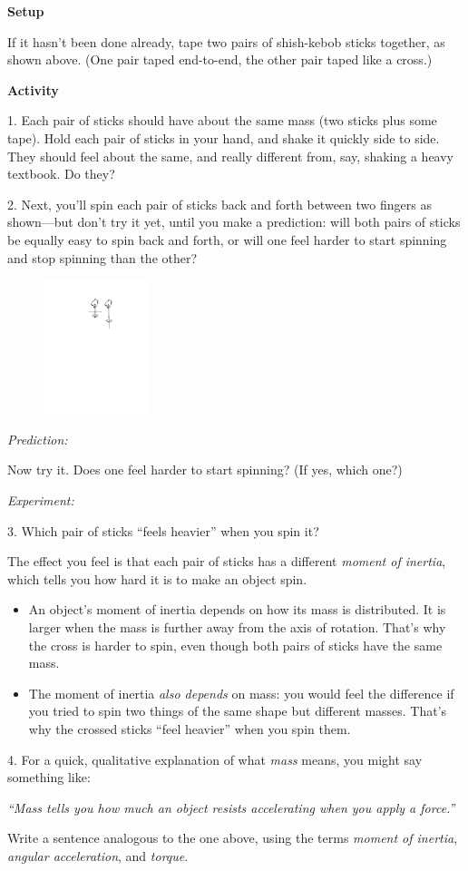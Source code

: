 \bigskip
\textbf{Setup}

If it hasn't been done already, tape two pairs of shish-kebob sticks together, as shown above.  (One pair taped end-to-end, the other pair taped like a cross.)

\bigskip
\textbf{Activity}

1.  Each pair of sticks should have about the same mass (two sticks plus some tape).  Hold each pair of sticks in your hand, and shake it quickly side to side.  They should feel about the same, and really different from, say, shaking a heavy textbook.  Do they?
\answerspace{0.2in}


2.  Next, you'll spin each pair of sticks back and forth between two fingers as shown---but don't try it yet, until you make a prediction: will both pairs of sticks be equally easy to spin back and forth, or will one feel harder to start spinning and stop spinning than the other?

\begin{figure}
    \vspace{-0.45in}
    \includegraphics[width=0.27\textwidth]{moment_inertia_feel/stick_pics2.pdf}
\end{figure}

\hspace{0.5in}\textit{Prediction:}
\answerspace{0.2in}

Now try it.  Does one feel harder to start spinning?  (If yes, which one?)

\hspace{0.5in}\textit{Experiment:}
\answerspace{0.2in}

3.  Which pair of sticks ``feels heavier'' when you spin it?
\answerspace{0.3in}

The effect you feel is that each pair of sticks has a different \textit{moment of inertia}, which tells you how hard it is to make an object spin.  
\begin{itemize}[nosep]
\item An object's moment of inertia depends on how its mass is distributed.  It is larger when the mass is further away from the axis of rotation.  That's why the cross is harder to spin, even though both pairs of sticks have the same mass.
\item The moment of inertia \textit{also depends} on mass: you would feel the difference if you tried to spin two things of the same shape but different masses.  That's why the crossed sticks ``feel heavier'' when you spin them.  
\end{itemize}
4. For a quick, qualitative explanation of what \textit{mass} means, you might say something like:

\hspace{0.5in}\textit{``Mass tells you how much an object resists accelerating when you apply a force.''}

Write a sentence analogous to the one above, using the terms \textit{moment of inertia}, \textit{angular acceleration}, and \textit{torque}.
\answerspace{0.3in}




